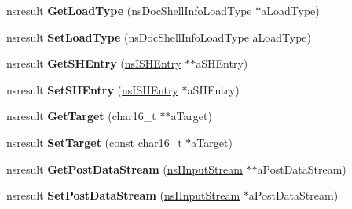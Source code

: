 \begin{DoxyCompactItemize}
\item 
\mbox{\label{interfacens_i_doc_shell_load_info_a142a49cc5dde342d5f4939e1aefd5bd5}} 
nsresult {\bfseries Get\+Load\+Type} (ns\+Doc\+Shell\+Info\+Load\+Type $\ast$a\+Load\+Type)
\item 
\mbox{\label{interfacens_i_doc_shell_load_info_ab91f89bbe1d409a964bc1cc504a69d2e}} 
nsresult {\bfseries Set\+Load\+Type} (ns\+Doc\+Shell\+Info\+Load\+Type a\+Load\+Type)
\item 
\mbox{\label{interfacens_i_doc_shell_load_info_a0e0e8b65e5fcf861339e6ad3a7ee00c2}} 
nsresult {\bfseries Get\+S\+H\+Entry} (\hyperlink{interfacens_i_supports}{ns\+I\+S\+H\+Entry} $\ast$$\ast$a\+S\+H\+Entry)
\item 
\mbox{\label{interfacens_i_doc_shell_load_info_a45bda5a199a9cb350a968a3cc34dbcdd}} 
nsresult {\bfseries Set\+S\+H\+Entry} (\hyperlink{interfacens_i_supports}{ns\+I\+S\+H\+Entry} $\ast$a\+S\+H\+Entry)
\item 
\mbox{\label{interfacens_i_doc_shell_load_info_abf9c37b55475704b429405c98f257aee}} 
nsresult {\bfseries Get\+Target} (char16\+\_\+t $\ast$$\ast$a\+Target)
\item 
\mbox{\label{interfacens_i_doc_shell_load_info_a62c6168615b9462e6cc2d83e4550fa1e}} 
nsresult {\bfseries Set\+Target} (const char16\+\_\+t $\ast$a\+Target)
\item 
\mbox{\label{interfacens_i_doc_shell_load_info_aae85ced3fdeaf57bd358b23be7d1904d}} 
nsresult {\bfseries Get\+Post\+Data\+Stream} (\hyperlink{interfacens_i_input_stream}{ns\+I\+Input\+Stream} $\ast$$\ast$a\+Post\+Data\+Stream)
\item 
\mbox{\label{interfacens_i_doc_shell_load_info_a4ef89a36439cac52f1006c1ec1bdd24e}} 
nsresult {\bfseries Set\+Post\+Data\+Stream} (\hyperlink{interfacens_i_input_stream}{ns\+I\+Input\+Stream} $\ast$a\+Post\+Data\+Stream)
\item 
\mbox{\label{interfacens_i_doc_shell_load_info_aa8fad07cf0f86ab5c4a3e3c9ceaf8c82}} 
$$
\end{DoxyCompactItemize}
